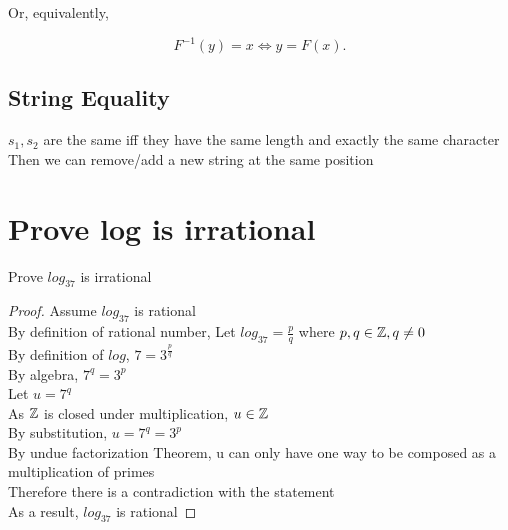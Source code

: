 \documentclass[a4paper]{article}
\begin{document}
Or, equivalently,

\[ F^{-1}(y) = x \iff y = F(x). \]
\subsection{String Equality}
$s_1,s_2$ are the same iff they have the same length and exactly the same character\\
Then we can remove/add a new string at the same position



\section{Prove log is irrational}
\begin{ex}
    Prove $log_37$ is irrational\\
\begin{proof}
    Assume $log_37$ is rational\\
    By definition of rational number, Let $log_37 = \frac{p}{q}$ where $p,q \in \mathbb{Z}, q \neq 0$\\
    By definition of $log$, $7 = 3^{\frac{p}{q}}$\\
    By algebra, $7^q = 3^p$\\
    Let $u = 7^q$\\
    As $\mathbb{Z}$ is closed under multiplication, $u \in \mathbb{Z}$\\
    By substitution, $u = 7^q = 3^p$\\
    By undue factorization Theorem, u can only have one way to be composed as a multiplication of primes\\
    Therefore there is a contradiction with the statement\\
    As a result, $log_37$ is rational
    
\end{proof}
\end{ex}
\end{document}
